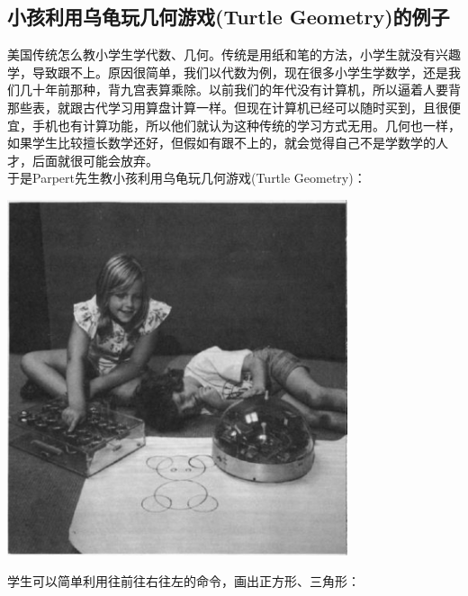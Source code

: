 \hypertarget{ux5c0fux5b69ux5229ux7528ux4e4cux9f9fux73a9ux51e0ux4f55ux6e38ux620fturtle-geometryux7684ux4f8bux5b50}{%
\subsection{小孩利用乌龟玩几何游戏(Turtle
Geometry)的例子}\label{ux5c0fux5b69ux5229ux7528ux4e4cux9f9fux73a9ux51e0ux4f55ux6e38ux620fturtle-geometryux7684ux4f8bux5b50}}

美国传统怎么教小学生学代数、几何。传统是用纸和笔的方法，小学生就没有兴趣学，导致跟不上。原因很简单，我们以代数为例，现在很多小学生学数学，还是我们几十年前那种，背九宫表算乘除。以前我们的年代没有计算机，所以逼着人要背那些表，就跟古代学习用算盘计算一样。但现在计算机已经可以随时买到，且很便宜，手机也有计算功能，所以他们就认为这种传统的学习方式无用。几何也一样，如果学生比较擅长数学还好，但假如有跟不上的，就会觉得自己不是学数学的人才，后面就很可能会放弃。\\
于是Parpert先生教小孩利用乌龟玩几何游戏(Turtle Geometry)：


\includegraphics[width=10cm]{mindstorm_p51.jpg}

学生可以简单利用往前往右往左的命令，画出正方形、三角形：


